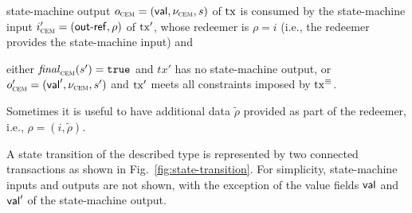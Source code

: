 \begin{mitemize}
  \item state-machine output $o_{\textsc{cem}} = (\mathsf{val}, \nu_{\textsc{cem}}, s)$ of $\mathrm{tx}$
  is consumed by the state-machine input $i_{\textsc{cem}}' = (\mathsf{out\textsf{-}{}ref}, \rho)$
  of $\mathrm{tx}'$, whose redeemer is \(\rho = i\) (i.e., the redeemer
  provides the state-machine input) and
  \item either $\mathit{final}_{\textsc{cem}}(s') = \mathtt{true}$ and $tx'$ has no state-machine
  output, or $o_{\textsc{cem}}' = (\mathsf{val}', \nu_{\textsc{cem}}, s')$ and $\mathrm{tx}'$ meets all
  constraints imposed by $\mathrm{tx}^\equiv$.
\end{mitemize}
Sometimes it is useful to have additional data $\tilde \rho$ provided
as part of the redeemer, i.e., $\rho = (i,\tilde \rho)$.

A state transition of the described type is represented by two connected
transactions as shown in Fig.~\ref{fig:state-transition}.  For
simplicity, state-machine inputs and outputs are not shown, with the
exception of the value fields $\mathsf{val}$ and $\mathsf{val}'$ of the state-machine output.


